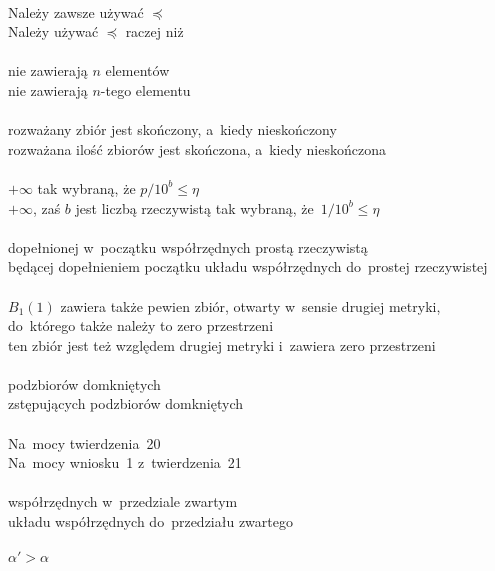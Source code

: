 \documentclass[a4paper,11pt]{article}
\numberwithin{equation}{section}
\begin{document}
\VerSpaceTwo


\noindent
{} \\
\Jest Należy zawsze używać $\preceq$ \\
\PowinnoByc Należy używać $\preceq$ raczej niż \\
 \\
\Jest nie zawierają $n$ elementów \\
\PowinnoByc nie zawierają $n$-tego elementu \\
 \\
\Jest rozważany zbiór jest skończony, a~kiedy nieskończony \\
\PowinnoByc rozważana ilość zbiorów jest skończona, a~kiedy nieskończona \\
 \\
\Jest $+\infty$ tak wybraną, że $p / 10^{ b } \leq \eta$ \\
\PowinnoByc $+\infty$, zaś $b$ jest liczbą rzeczywistą tak wybraną,
że~$1 / 10^{ b } \leq \eta$ \\
 \\
\Jest dopełnionej w~początku współrzędnych prostą rzeczywistą \\
\PowinnoByc będącej dopełnieniem początku układu współrzędnych do~prostej
rzeczywistej \\
 \\
\Jest $B_{ 1 }( 1 )$ zawiera także pewien zbiór, otwarty w~sensie
drugiej metryki, do~którego także należy to zero przestrzeni \\
\PowinnoByc ten zbiór jest też względem drugiej metryki i~zawiera zero
przestrzeni \\ %
 \\
\Jest podzbiorów domkniętych \\
\PowinnoByc zstępujących podzbiorów domkniętych \\
 \\
\Jest Na~mocy twierdzenia~20 \\
\PowinnoByc Na~mocy wniosku~1 z~twierdzenia~21 \\
 \\
\Jest współrzędnych w~przedziale zwartym \\
\PowinnoByc układu współrzędnych do~przedziału zwartego \\
 \\
\Jest $\alpha' > \alpha$ \\
\end{document}
